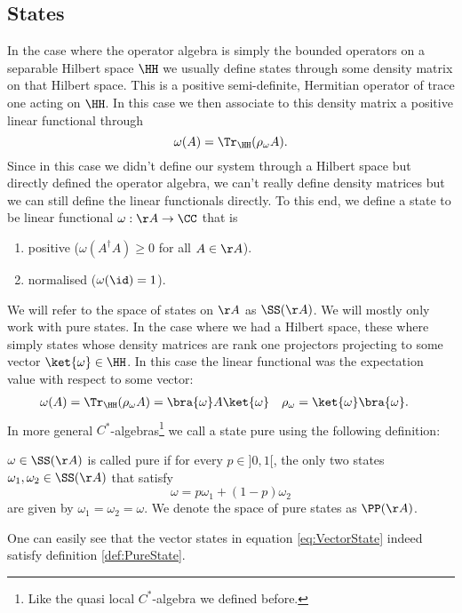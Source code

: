 \subsection{States}
In the case where the operator algebra is simply the bounded operators on a separable Hilbert space $\HH$ we usually define states through some density matrix on that Hilbert space. This is a positive semi-definite, Hermitian operator of trace one acting on $\HH$. In this case we then associate to this density matrix a positive linear functional through
\begin{equation}
	\omega(A)= \Tr_\HH(\rho_\omega A).
\end{equation}
Since in this case we didn't define our system through a Hilbert space but directly defined the operator algebra, we can't really define density matrices but we can still define the linear functionals directly. To this end, we define a state to be linear functional $\omega:\AA\rightarrow \CC$ that is
\begin{enumerate}
	\item positive ($\omega(A^\dagger A)\geq 0$ for all $A\in\AA$).
	\item normalised ($\omega(\id)=1$).
\end{enumerate}
We will refer to the space of states on $\AA$ as $\SS(\AA)$. We will mostly only work with pure states. In the case where we had a Hilbert space, these where simply states whose density matrices are rank one projectors projecting to some vector $\ket{\omega}\in\HH$. In this case the linear functional was the expectation value with respect to some vector:
\begin{align}\label{eq:VectorState}
	\omega(A)&=\Tr_\HH(\rho_\omega A)=\bra{\omega}A\ket{\omega}&\rho_\omega&=\ket{\omega}\bra{\omega}.
\end{align}
In more general $C^*$-algebras\footnote{Like the quasi local $C^*$-algebra we defined before.} we call a state pure using the following definition:
\begin{definition}[pure]\label{def:PureState}
	$\omega\in\SS(\AA)$ is called pure if for every $p\in]0,1[$, the only two states $\omega_1,\omega_2\in\SS(\AA)$ that satisfy
	\begin{equation}
		\omega=p\omega_1+(1-p)\omega_2
	\end{equation}
	are given by $\omega_1=\omega_2=\omega$. We denote the space of pure states as $\PP(\AA)$.
\end{definition}
One can easily see that the vector states in equation \eqref{eq:VectorState} indeed satisfy definition \ref{def:PureState}.
